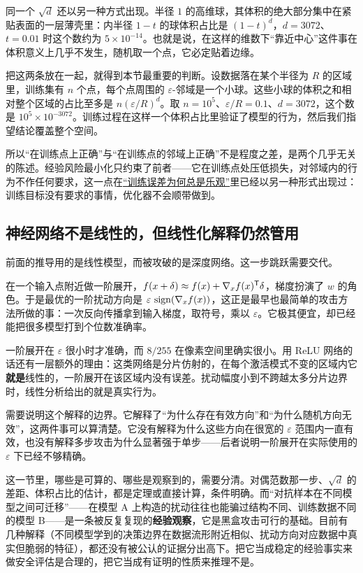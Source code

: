 同一个 \(\sqrt d\) 还以另一种方式出现。半径 \(1\) 的高维球，其体积的绝大部分集中在紧贴表面的一层薄壳里：内半径 \(1-t\) 的球体积占比是 \((1-t)^d\)，\(d=3072\)、\(t=0.01\) 时这个数约为 \(5\times10^{-14}\)。也就是说，在这样的维数下``靠近中心''这件事在体积意义上几乎不发生，随机取一个点，它必定贴着边缘。

把这两条放在一起，就得到本节最重要的判断。设数据落在某个半径为 \(R\) 的区域里，训练集有 \(n\) 个点，每个点周围的 \(\varepsilon\)-邻域是一个小球。这些小球的体积之和相对整个区域的占比至多是 \(n(\varepsilon/R)^d\)。取 \(n=10^5\)、\(\varepsilon/R=0.1\)、\(d=3072\)，这个数是 \(10^5\times10^{-3072}\)。训练过程在这样一个体积占比里验证了模型的行为，然后我们指望结论覆盖整个空间。

所以``在训练点上正确''与``在训练点的邻域上正确''不是程度之差，是两个几乎无关的陈述。经验风险最小化只约束了前者——它在训练点处压低损失，对邻域内的行为不作任何要求，这一点在\hyperref[sec:13-Machine-Learning/10-Learning-Theory/01]{``训练误差为何总是乐观''}里已经以另一种形式出现过：训练目标没有要求的事情，优化器不会顺带做到。

\subsection{神经网络不是线性的，但线性化解释仍然管用}

前面的推导用的是线性模型，而被攻破的是深度网络。这一步跳跃需要交代。

在一个输入点附近做一阶展开，\(f(x+\delta)\approx f(x)+\nabla_x f(x)^{\mathsf{T}}\delta\)，梯度扮演了 \(w\) 的角色。于是最优的一阶扰动方向是 \(\varepsilon\,\operatorname{sign}(\nabla_x f(x))\)，这正是最早也最简单的攻击方法所做的事：一次反向传播拿到输入梯度，取符号，乘以 \(\varepsilon\)。它极其便宜，却已经能把很多模型打到个位数准确率。

一阶展开在 \(\varepsilon\) 很小时才准确，而 \(8/255\) 在像素空间里确实很小。用 ReLU 网络的话还有一层额外的理由：这类网络是分片仿射的，在每个激活模式不变的区域内它\textbf{就是}线性的，一阶展开在该区域内没有误差。扰动幅度小到不跨越太多分片边界时，线性分析给出的就是真实行为。

需要说明这个解释的边界。它解释了``为什么存在有效方向''和``为什么随机方向无效''，这两件事可以算清楚。它没有解释为什么这些方向在很宽的 \(\varepsilon\) 范围内一直有效，也没有解释多步攻击为什么显著强于单步——后者说明一阶展开在实际使用的 \(\varepsilon\) 下已经不够精确。

\begin{remark}
这一节里，哪些是可算的、哪些是观察到的，需要分清。对偶范数那一步、\(\sqrt d\) 的差距、体积占比的估计，都是定理或直接计算，条件明确。而``对抗样本在不同模型之间可迁移''——在模型 A 上构造的扰动往往也能骗过结构不同、训练数据不同的模型 B——是一条被反复复现的\textbf{经验观察}，它是黑盒攻击可行的基础。目前有几种解释（不同模型学到的决策边界在数据流形附近相似、扰动方向对应数据中真实但脆弱的特征），都还没有被公认的证据分出高下。把它当成稳定的经验事实来做安全评估是合理的，把它当成有证明的性质来推理不是。
\end{remark}

